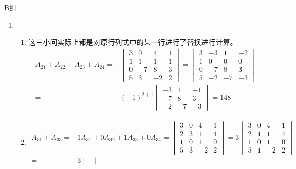 \centerline{\heiti B组}
\begin{enumerate}
    \item \begin{enumerate}
        \item 这三小问实际上都是对原行列式中的某一行进行了替换进行计算。
        \begin{align*}
            A_{21}+A_{22}+A_{23}+A_{24} ={} & \begin{vmatrix}
                3 & 0 & 4 & 1 \\
                1 & 1 & 1 & 1 \\
                0 & -7 & 8 & 3 \\
                5 & 3 & -2 & 2
            \end{vmatrix} = \begin{vmatrix}
                3 & -3 & 1 & -2 \\
                1 & 0 & 0 & 0 \\
                0 & -7 & 8 & 3 \\
                5 & -2 & -7 & -3
            \end{vmatrix} \\
            ={} & (-1)^{2+1} \begin{vmatrix}
                -3 & 1 & -1 \\
                -7 & 8 & 3 \\
                -2 & -7 & -3
            \end{vmatrix} = 148
        \end{align*}
        \item \begin{align*}
            A_{31}+A_{33} ={} & 1A_{31}+0A_{32}+1A_{33}+0A_{34} = \begin{vmatrix}
                3 & 0 & 4 & 1 \\
                2 & 3 & 1 & 4 \\
                1 & 0 & 1 & 0 \\
                5 & 3 & -2 & 2
            \end{vmatrix} = 3 \begin{vmatrix}
                3 & 0 & 4 & 1 \\
                2 & 1 & 1 & 4 \\
                1 & 0 & 1 & 0 \\
                5 & 1 & -2 & 2
            \end{vmatrix} \\
            ={} & 3 \begin{vmatrix}

\end{vmatrix}
\end{align*}
\end{enumerate}
\end{enumerate}

